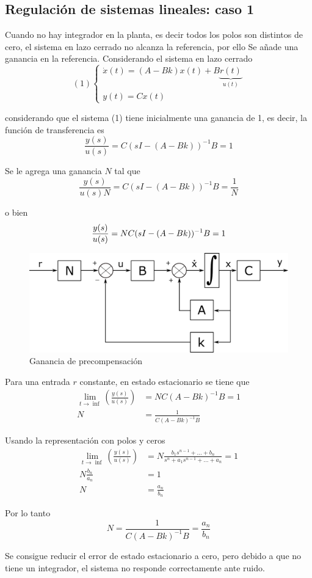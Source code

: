 \subsection{Regulación de sistemas lineales: caso 1}

Cuando no hay integrador en la planta, es decir todos los polos son distintos de cero, el sistema en lazo cerrado no alcanza la referencia, por ello Se añade una ganancia en la referencia.
Considerando el sistema en lazo cerrado
\[(1)
    \left\{
        \begin{array}{lll}
            \dot{x}(t) = (A-Bk)x(t) + B\underbrace{r(t)}_{u(t)} \\
            y(t) = Cx(t)
        \end{array}
    \right.
\]

considerando que el sistema (1) tiene inicialmente una ganancia de 1, es decir, la función de transferencia es
\[
    \frac{y(s)}{u(s)} = C(sI-(A-Bk))^{-1}B = 1
\]

Se le agrega una ganancia \( N \) tal que
\[
    \frac{y(s)}{u(s)N} = C(sI-(A-Bk))^{-1}B = \frac{1}{N}
\]

o bien
\[
    \frac{y(s)}{u(s)} = NC(sI-(A-Bk))^{-1}B = 1 \\
\]

\begin{figure}[h!]
    \centering
        \includegraphics[scale=0.20]{Control de Sistemas Mecatronicos Figuras/14 Ganancia de precompensacion.png}
        \caption{Ganancia de precompensación}
\end{figure}

Para una entrada \( r \) constante, en estado estacionario se tiene que 
\[
    \begin{split}
        \lim_{t \to \inf}(\frac{y(s)}{u(s)}) & = NC(A-Bk)^{-1}B = 1 \\
        N & = \frac{1}{C(A-Bk)^{-1}B}
    \end{split}
\]

Usando la representación con polos y ceros
\[
    \begin{split}
        \lim_{t \to \inf}(\frac{y(s)}{u(s)}) & = N \frac{ b_{1}s^{n-1} + \ldots + b_{n} }{ s^{n} + a_{1}s^{n-1} +\ldots + a_{n} } = 1 \\
        N \frac{b_{n}}{a_{n}} & = 1 \\
        N & = \frac{a_{n}}{b_{n}}
    \end{split}
\]

Por lo tanto
\[
    N = \frac{1}{C(A-Bk)^{-1}B} = \frac{a_{n}}{b_{n}}
\]

Se consigue reducir el error de estado estacionario a cero, pero debido a que no tiene un integrador, el sistema no responde correctamente ante ruido.